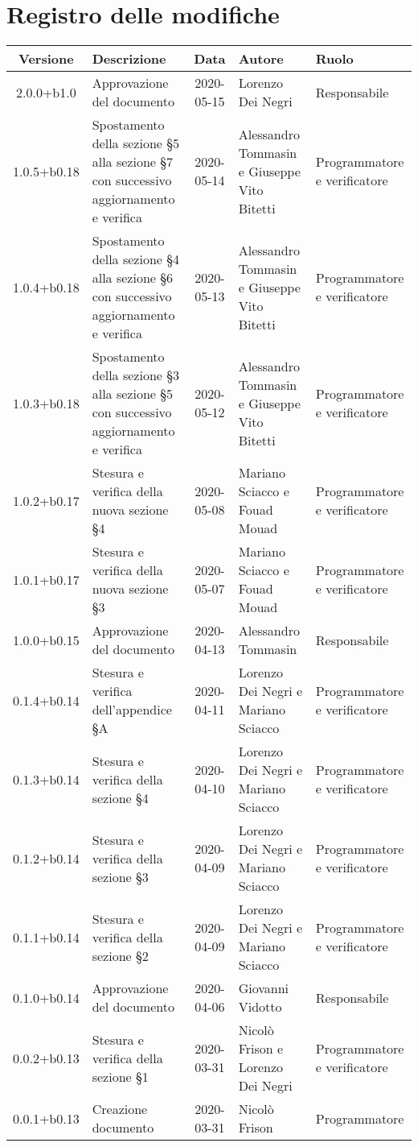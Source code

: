 \section*{Registro delle modifiche}

\begin{center}
	\begin{longtable}{|c|p{3.5cm}|c|p{3cm}|p{3cm}|}
	\hline
	\rowcolor{lighter-grayer}
	\textbf{Versione} & \textbf{Descrizione} & \textbf{Data} & \textbf{Autore} & \textbf{Ruolo} \\
	\hline
	\endfirsthead
	
	2.0.0+b1.0 & Approvazione del documento & 2020-05-15 & Lorenzo Dei Negri & Responsabile \\
	\hline
	1.0.5+b0.18 & Spostamento della sezione \S5 alla sezione \S7 con successivo aggiornamento e verifica & 2020-05-14 & Alessandro Tommasin e Giuseppe Vito Bitetti & Programmatore e verificatore \\
	\hline
	1.0.4+b0.18 & Spostamento della sezione \S4 alla sezione \S6 con successivo aggiornamento e verifica & 2020-05-13 & Alessandro Tommasin e Giuseppe Vito Bitetti & Programmatore e verificatore \\
	\hline
	1.0.3+b0.18 & Spostamento della sezione \S3 alla sezione \S5 con successivo aggiornamento e verifica & 2020-05-12 & Alessandro Tommasin e Giuseppe Vito Bitetti & Programmatore e verificatore \\
	\hline
	1.0.2+b0.17 & Stesura e verifica della nuova sezione \S4 & 2020-05-08 & Mariano Sciacco e Fouad Mouad & Programmatore e verificatore \\
	\hline
	1.0.1+b0.17 & Stesura e verifica della nuova sezione \S3 & 2020-05-07 & Mariano Sciacco e Fouad Mouad & Programmatore e verificatore \\
	\hline
	1.0.0+b0.15 & Approvazione del documento & 2020-04-13 & Alessandro Tommasin & Responsabile \\
	\hline
	0.1.4+b0.14 & Stesura e verifica dell'appendice \S A & 2020-04-11 & Lorenzo Dei Negri e Mariano Sciacco & Programmatore e verificatore \\
	\hline
	0.1.3+b0.14 & Stesura e verifica della sezione \S4 & 2020-04-10 & Lorenzo Dei Negri e Mariano Sciacco & Programmatore e verificatore \\
	\hline
	0.1.2+b0.14 & Stesura e verifica della sezione \S3 & 2020-04-09 & Lorenzo Dei Negri e Mariano Sciacco & Programmatore e verificatore \\
	\hline
	0.1.1+b0.14 & Stesura e verifica della sezione \S2 & 2020-04-09 & Lorenzo Dei Negri e Mariano Sciacco & Programmatore e verificatore \\
	\hline
	0.1.0+b0.14 & Approvazione del documento & 2020-04-06 & Giovanni Vidotto & Responsabile \\
	\hline
	0.0.2+b0.13 & Stesura e verifica della sezione \S1 & 2020-03-31 & Nicolò Frison e Lorenzo Dei Negri & Programmatore e verificatore \\
	\hline
	0.0.1+b0.13 & Creazione documento & 2020-03-31 & Nicolò Frison & Programmatore \\
	\hline
	\end{longtable}
\end{center}
